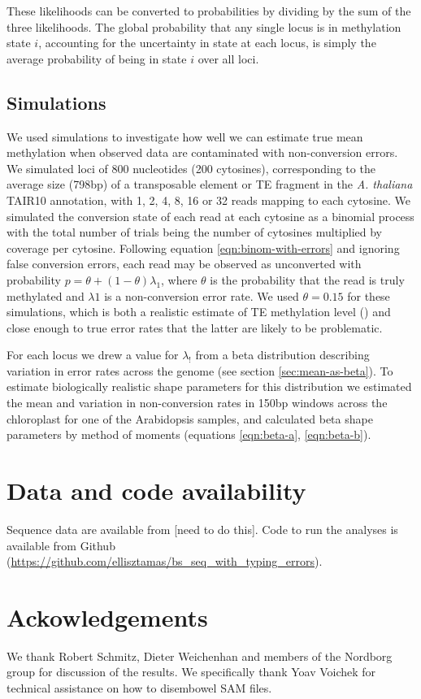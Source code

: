 \documentclass[12pt,longbibliography]{article}
\begin{document}
These likelihoods can be converted to probabilities by dividing by the sum of the three likelihoods.
The global probability that any single locus is in methylation state $i$, accounting for the uncertainty in state at each locus, is simply the average probability of being in state $i$ over all loci.

\subsection{Simulations}

We used simulations to investigate how well we can estimate true mean methylation when observed data are contaminated with non-conversion errors.
We simulated loci of 800 nucleotides (200 cytosines), corresponding to the average size (798bp) of a transposable element or TE fragment in the \textit{A. thaliana} TAIR10 annotation, with 1, 2, 4, 8, 16 or 32 reads mapping to each cytosine.
We simulated the conversion state of each read at each cytosine as a binomial process with the total number of trials being the number of cytosines multiplied by coverage per cytosine.
Following equation \ref{eqn:binom-with-errors} and ignoring false conversion errors, each read may be observed as unconverted with probability $p=\theta + (1-\theta)\lambda_1$, where $\theta$ is the probability that the read is truly methylated and $\lambda1$ is a non-conversion error rate.
We used $\theta=0.15$ for these simulations, which is both a realistic estimate of TE methylation level (\cite{dubin2015dna}) and close enough to true error rates that the latter are likely to be problematic.

For each locus we drew a value for $\lambda_!$ from a beta distribution describing variation in error rates across the genome (see section \ref{sec:mean-as-beta}).
To estimate biologically realistic shape parameters for this distribution we estimated the mean and variation in non-conversion rates in 150bp windows across the chloroplast for one of the Arabidopsis samples, and calculated beta shape parameters by method of moments (equations \ref{eqn:beta-a}, \ref{eqn:beta-b}). 

\section{Data and code availability}

Sequence data are available from [need to do this].
Code to run the analyses is available from Github (\url{https://github.com/ellisztamas/bs_seq_with_typing_errors}).

\section{Ackowledgements}

We thank Robert Schmitz, Dieter Weichenhan and members of the Nordborg group for discussion of the results.
We specifically thank Yoav Voichek for technical assistance on how to disembowel SAM files.

\printbibliography %
\end{document}
